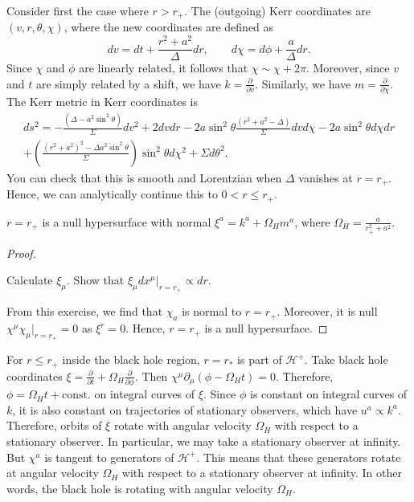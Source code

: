 Consider first the case where $r > r_+$.
The (outgoing) Kerr coordinates are $(v, r, \theta, \chi)$, where the new coordinates are defined as
\begin{equation}
  dv = dt + \frac{r^2 + a^2}{\Delta} dr, \qquad d\chi = d\phi + \frac{a}{\Delta} dr.
\end{equation}
Since $\chi$ and $\phi$ are linearly related, it follows that $\chi \sim \chi + 2 \pi$.
Moreover, since $v$ and $t$ are simply related by a shift, we have $k = \frac{\partial }{\partial v}$. Similarly, we have $m = \frac{\partial }{\partial \chi}$.
The Kerr metric in Kerr coordinates is
\begin{multline}
  ds^2 = -\frac{(\Delta - a^2 \sin^2 \theta)}{\Sigma} dv^2 + 2 d v dr - 2a \sin^2 \theta \frac{(r^2 + a ^2 - \Delta)}{\Sigma} d v d\chi - 2a \sin^2 \theta d\chi dr \\
  + \left( \frac{(r^2 + a^2)^2 - \Delta a^2 \sin^2 \theta}{\Sigma} \right) \sin^2 \theta d \chi^2 + \Sigma d\theta^2.
\end{multline}
You can check that this is smooth and Lorentzian when $\Delta$ vanishes at $r = r_+$. Hence, we can analytically continue this to $0 < r \leq r_+$.

\begin{claim}
  $r = r_+$ is a null hypersurface with normal $\xi^{a} = k^{a} + \Omega_H m^{a}$, where $\Omega_H = \frac{a}{r^2_+ + a^2}$.
\end{claim}
\begin{proof}
  \begin{exercise}
    Calculate $\xi_\mu$. Show that $\xi_\mu d x^{\mu} \rvert_{r = r_+} \propto dr$.
  \end{exercise}
  From this exercise, we find that $\chi_a$ is normal to $r = r_+$.
  Moreover, it is null $\chi^{\mu} \chi_{\mu} \rvert_{r = r_+} = 0$ as $\xi^r = 0$.
  Hence, $r = r_+$ is a null hypersurface.
\end{proof}

For $r \leq r_+$ inside the black hole region, $r = r_*$ is part of $\mathcal{H}^+$.
Take black hole coordinates $\xi = \frac{\partial }{\partial t} + \Omega_H \frac{\partial }{\partial \phi}$. Then $\chi^{\mu} \partial_{\mu} (\phi - \Omega_H t) = 0$. 
Therefore, $\phi = \Omega_H t + \text{const.}$ on integral curves of $\xi$.
Since $\phi$ is constant on integral curves of $k$, it is also constant on trajectories of stationary observers, which have $u^{a} \propto k^{a}$.
Therefore, orbits of $\xi$ rotate with angular velocity $\Omega_H$ with respect to a stationary observer.
In particular, we may take a stationary observer at infinity.
But $\chi^{a}$ is tangent to generators of $\mathcal{H}^+$. This means that these generators rotate at angular velocity $\Omega_H$ with respect to a stationary observer at infinity.
In other words, the black hole is rotating with angular velocity $\Omega_H$.


